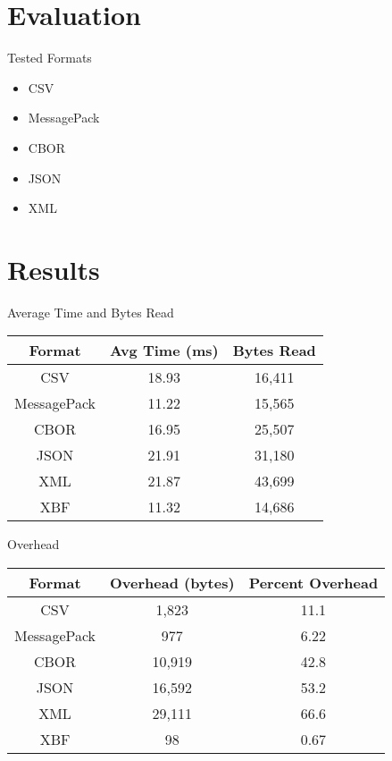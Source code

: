 \documentclass{beamer}
\begin{document}
\section{Evaluation}

\begin{frame}{Tested Formats}
	\begin{itemize}
		\item CSV
		\item MessagePack
		\item CBOR
		\item JSON
		\item XML
	\end{itemize}
\end{frame}

\section{Results}

\begin{frame}{Average Time and Bytes Read}
	\center
	\begin{tabular}{|c|c|c|}
		\hline
		\textbf{Format} & \textbf{Avg Time (ms)} & \textbf{Bytes Read} \\
		\hline
		CSV             & 18.93                  & 16,411              \\
		MessagePack     & 11.22                  & 15,565              \\
		CBOR            & 16.95                  & 25,507              \\
		JSON            & 21.91                  & 31,180              \\
		XML             & 21.87                  & 43,699              \\
		XBF             & 11.32                  & 14,686              \\
		\hline
	\end{tabular}
\end{frame}

\begin{frame}{Overhead}
	\center
	\begin{tabular}{|c|c|c|}
		\hline
		\textbf{Format} & \textbf{Overhead (bytes)} & \textbf{Percent Overhead} \\
		\hline
		CSV             & 1,823                     & 11.1                      \\
		MessagePack     & 977                       & 6.22                      \\
		CBOR            & 10,919                    & 42.8                      \\
		JSON            & 16,592                    & 53.2                      \\
		XML             & 29,111                    & 66.6                      \\
		XBF             & 98                        & 0.67                      \\
		\hline
	\end{tabular}
\end{frame}

\backmatter[notitle]
\end{document}
